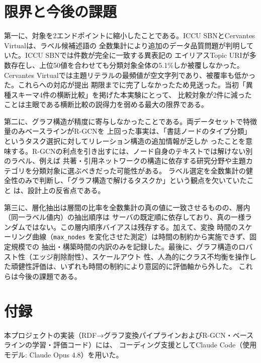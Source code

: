 \documentclass[dvipdfmx,twoside,11pt]{article}
\begin{document}
\section{限界と今後の課題}
\label{sec:limitation}

第一に、対象を2エンドポイントに縮小したことである。ICCU SBNとCervantes Virtualは、ラベル候補述語の
全数集計により追加のデータ品質問題が判明していた。ICCU SBNでは件数が完全に一致する異表記の
エイリアスTopic URIが多数存在し、上位50値を合わせても分類対象全体の5.1\%しか被覆しなかった。
Cervantes Virtualでは主題リテラルの最頻値が空文字列であり、被覆率も低かった。これらへの対応が提出
期限までに完了しなかったため見送った。当初「異種スキーマ4件の横断比較」を掲げた本実験にとって、
比較対象が2件に減ったことは主眼である横断比較の説得力を弱める最大の限界である。

第二に、グラフ構造が精度に寄与しなかったことである。両データセットで特徴量のみベースラインがR-GCNを
上回った事実は、「書誌ノードのタイプ分類」というタスク選択に対してリレーション構造の追加情報が乏しか
ったことを意味する。R-GCNの利点を引き出すには、ノード自身のテキストでは解けない別のラベル、例えば
共著・引用ネットワークの構造に依存する研究分野や主題カテゴリを分類対象に選ぶべきだった可能性がある。
ラベル選定を全数集計の健全性のみで判断し、「グラフ構造で解けるタスクか」という観点を欠いていたこと
は、設計上の反省点である。

第三に、層化抽出は層間の比率を全数集計の真の値に一致させるものの、層内（同一ラベル値内）の抽出順序は
サーバの既定順に依存しており、真の一様ランダムではない。この層内順序バイアスは残存する。加えて、変換
時間のスケーリング曲線（\texttt{max\_nodes} を変化させた測定）は時間の制約から実施できず、固定規模での
抽出・構築時間の内訳のみを記録した。最後に、グラフ構造のロバスト性（エッジ削除耐性）、スケールアウト
性、人為的にクラス不均衡を操作した頑健性評価は、いずれも時間の制約により意図的に評価軸から外した。
これらは今後の課題である。

\section*{付録}

本プロジェクトの実装（RDF→グラフ変換パイプラインおよびR-GCN・ベースラインの学習・評価コード）には、
コーディング支援としてClaude Code（使用モデル: Claude Opus 4.8）を用いた。

\vskip 0.2in

\end{document}
